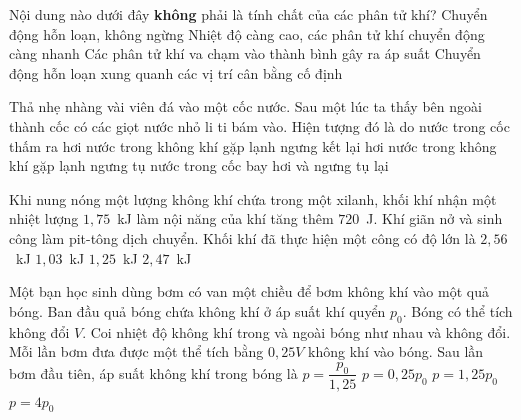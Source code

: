 	\begin{ex}%
		Nội dung nào dưới đây \textbf{không} phải là tính chất của các phân tử khí?
		\choice
		{Chuyển động hỗn loạn, không ngừng}
		{Nhiệt độ càng cao, các phân tử khí chuyển động càng nhanh}
		{Các phân tử khí va chạm vào thành bình gây ra áp suất}
		{\True Chuyển động hỗn loạn xung quanh các vị trí cân bằng cố định}
	\end{ex}

	\begin{ex}%
		Thả nhẹ nhàng vài viên đá vào một cốc nước. Sau một lúc ta thấy bên ngoài thành cốc có các giọt nước nhỏ li ti bám vào. Hiện tượng đó là do
		\choice
		{nước trong cốc thấm ra}
		{hơi nước trong không khí gặp lạnh ngưng kết lại}
		{\True hơi nước trong không khí gặp lạnh ngưng tụ}
		{nước trong cốc bay hơi và ngưng tụ lại}
	\end{ex}

	\begin{ex}%
		Khi nung nóng một lượng không khí chứa trong một xilanh, khối khí nhận một nhiệt lượng $1{,}75$~kJ làm nội năng của khí tăng thêm $720$~J. Khí giãn nở và sinh công làm pit-tông dịch chuyển. Khối khí đã thực hiện một công có độ lớn là
		\choice
		{$2{,}56$~kJ}
		{\True $1{,}03$~kJ}
		{$1{,}25$~kJ}
		{$2{,}47$~kJ}
	\end{ex}

	\begin{ex}%
		Một bạn học sinh dùng bơm có van một chiều để bơm không khí vào một quả bóng. Ban đầu quả bóng chứa không khí ở áp suất khí quyển $p_0$. Bóng có thể tích không đổi $V$. Coi nhiệt độ không khí trong và ngoài bóng như nhau và không đổi. Mỗi lần bơm đưa được một thể tích bằng $0{,}25V$ không khí vào bóng. Sau lần bơm đầu tiên, áp suất không khí trong bóng là
		\choice
		{$p=\dfrac{p_0}{1{,}25}$}
		{$p=0{,}25p_0$}
		{\True $p=1{,}25p_0$}
		{$p=4p_0$}
	\end{ex}

